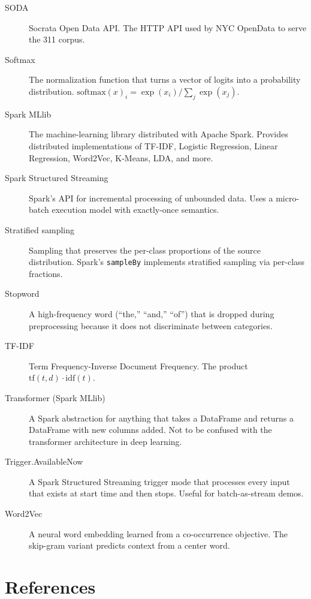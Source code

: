 \documentclass[11pt,letterpaper]{book}
\begin{document}
\begin{description}
\item[SODA] Socrata Open Data API. The HTTP API used by NYC OpenData to serve the 311 corpus.
\item[Softmax] The normalization function that turns a vector of logits into a probability distribution. $\mathrm{softmax}(x)_i = \exp(x_i) / \sum_j \exp(x_j)$.
\item[Spark MLlib] The machine-learning library distributed with Apache Spark. Provides distributed implementations of TF-IDF, Logistic Regression, Linear Regression, Word2Vec, K-Means, LDA, and more.
\item[Spark Structured Streaming] Spark's API for incremental processing of unbounded data. Uses a micro-batch execution model with exactly-once semantics.
\item[Stratified sampling] Sampling that preserves the per-class proportions of the source distribution. Spark's \texttt{sampleBy} implements stratified sampling via per-class fractions.
\item[Stopword] A high-frequency word (``the,'' ``and,'' ``of'') that is dropped during preprocessing because it does not discriminate between categories.
\item[TF-IDF] Term Frequency-Inverse Document Frequency. The product $\mathrm{tf}(t, d) \cdot \mathrm{idf}(t)$.
\item[Transformer (Spark MLlib)] A Spark abstraction for anything that takes a DataFrame and returns a DataFrame with new columns added. Not to be confused with the transformer architecture in deep learning.
\item[Trigger.AvailableNow] A Spark Structured Streaming trigger mode that processes every input that exists at start time and then stops. Useful for batch-as-stream demos.
\item[Word2Vec] A neural word embedding learned from a co-occurrence objective. The skip-gram variant predicts context from a center word.
\end{description}

\chapter*{References}
\end{document}
